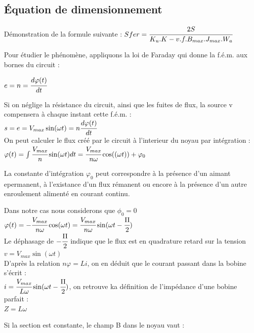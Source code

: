 	

\subsection{Équation de dimensionnement}

Démonstration de la formule suivante : $ Sfer = \cfrac{2S}{K_u.K-v.f.B_{max}.J_{max}.W_a}$


Pour étudier le phénomène, appliquons la loi de Faraday qui donne la f.é.m. aux bornes du circuit : 

$e = n= \cfrac{d\varphi(t)}{dt}$

Si on néglige la résistance du circuit, ainsi que les fuites de flux, la source v compensera à chaque instant cette f.é.m. : \\
$s = e = V_{max}\sin(\omega{}t) = n\cfrac{d\varphi(t)}{dt}$\\


On peut calculer le flux créé par le circuit à l'interieur du noyau par intégration : \\
$\varphi(t) = \int {\cfrac{V_{max}}{n} \sin(\omega{}t) dt} = \cfrac{V_{max}}{n\omega}\cos((\omega{}t)) + \varphi_0$

La constante d'intégration $\varphi_0$ peut correspondre à la présence d'un aimant epermanent, à l'existance d'un flux rémanent ou encore à la présence d'un autre enroulement alimenté en courant continu. 

Dans notre cas nous considerons que $\phi_0 = 0$\\

$\varphi(t) = - \cfrac{V_{max}}{n\omega} \cos(\omega{}t) = \cfrac{V_{max}}{n\omega} \sin(\omega{}t - \cfrac{\Pi}{2})$\\


Le déphasage de $- \cfrac{\Pi}{2}$ indique que le flux est en quadrature retard sur la tension $v =  V_{max}\sin(\omega{}t)$\\

D'après la relation $n\varphi = Li$, on en déduit que le courant passant dans la bobine s'écrit : \\

$i = \cfrac{V_{max}}{L\omega} \sin(\omega{}t - \cfrac{\Pi}{2})$, on retrouve ka définition de l'impédance d'une bobine parfait :\\

$Z = L\omega$


Si la section est constante, le champ B dans le noyau vaut : \\

